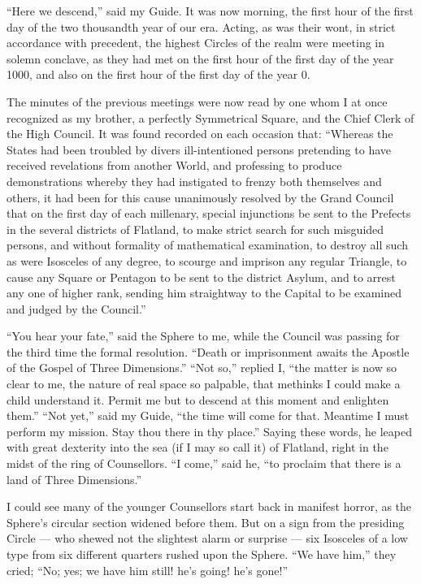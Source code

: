 \documentclass[12pt, a4paper, oneside]{memoir}
\begin{document}
``Here we descend,'' said my Guide. It was now morning, the first hour of the
first day of the two thousandth year of our era. Acting, as was their wont, in
strict accordance with precedent, the highest Circles of the realm were
meeting in solemn conclave, as they had met on the first hour of the first day
of the year 1000, and also on the first hour of the first day of the year 0.

The minutes of the previous meetings were now read by one whom I at once
recognized as my brother, a perfectly Symmetrical Square, and the Chief Clerk
of the High Council. It was found recorded on each occasion that: ``Whereas the
States had been troubled by divers ill-intentioned persons pretending to have
received revelations from another World, and professing to produce
demonstrations whereby they had instigated to frenzy both themselves and
others, it had been for this cause unanimously resolved by the Grand Council
that on the first day of each millenary, special injunctions be sent to the
Prefects in the several districts of Flatland, to make strict search for such
misguided persons, and without formality of mathematical examination, to
destroy all such as were Isosceles of any degree, to scourge and imprison any
regular Triangle, to cause any Square or Pentagon to be sent to the district
Asylum, and to arrest any one of higher rank, sending him straightway to the
Capital to be examined and judged by the Council.''

``You hear your fate,'' said the Sphere to me, while the Council was passing for
the third time the formal resolution. ``Death or imprisonment awaits the
Apostle of the Gospel of Three Dimensions.'' ``Not so,'' replied I, ``the matter
is now so clear to me, the nature of real space so palpable, that methinks I
could make a child understand it. Permit me but to descend at this moment and
enlighten them.'' ``Not yet,'' said my Guide, ``the time will come for that.
Meantime I must perform my mission. Stay thou there in thy place.'' Saying
these words, he leaped with great dexterity into the sea (if I may so call it)
of Flatland, right in the midst of the ring of Counsellors. ``I come,'' said he,
``to proclaim that there is a land of Three Dimensions.''

I could see many of the younger Counsellors start back in manifest horror, as
the Sphere's circular section widened before them. But on a sign from the
presiding Circle --- who shewed not the slightest alarm or surprise --- six
Isosceles of a low type from six different quarters rushed upon the Sphere.
``We have him,'' they cried; ``No; yes; we have him still! he's going! he's
gone!''
\end{document}
